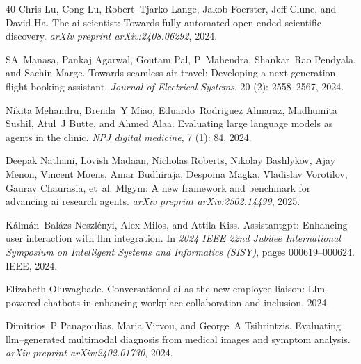 \begin{thebibliography}{40}
Chris Lu, Cong Lu, Robert~Tjarko Lange, Jakob Foerster, Jeff Clune, and David Ha.
\newblock The ai scientist: Towards fully automated open-ended scientific discovery.
\newblock \emph{arXiv preprint arXiv:2408.06292}, 2024.

SA~Manasa, Pankaj Agarwal, Goutam Pal, P~Mahendra, Shankar~Rao Pendyala, and Sachin Marge.
\newblock Towards seamless air travel: Developing a next-generation flight booking assistant.
\newblock \emph{Journal of Electrical Systems}, 20 (2): 2558--2567, 2024.

Nikita Mehandru, Brenda~Y Miao, Eduardo~Rodriguez Almaraz, Madhumita Sushil, Atul~J Butte, and Ahmed Alaa.
\newblock Evaluating large language models as agents in the clinic.
\newblock \emph{NPJ digital medicine}, 7 (1): 84, 2024.

Deepak Nathani, Lovish Madaan, Nicholas Roberts, Nikolay Bashlykov, Ajay Menon, Vincent Moens, Amar Budhiraja, Despoina Magka, Vladislav Vorotilov, Gaurav Chaurasia, et~al.
\newblock Mlgym: A new framework and benchmark for advancing ai research agents.
\newblock \emph{arXiv preprint arXiv:2502.14499}, 2025.

K{\'a}lm{\'a}n~Bal{\'a}zs Neszl{\'e}nyi, Alex Milos, and Attila Kiss.
\newblock Assistantgpt: Enhancing user interaction with llm integration.
\newblock In \emph{2024 IEEE 22nd Jubilee International Symposium on Intelligent Systems and Informatics (SISY)}, pages 000619--000624. IEEE, 2024.

Elizabeth Oluwagbade.
\newblock Conversational ai as the new employee liaison: Llm-powered chatbots in enhancing workplace collaboration and inclusion, 2024.

Dimitrios~P Panagoulias, Maria Virvou, and George~A Tsihrintzis.
\newblock Evaluating llm--generated multimodal diagnosis from medical images and symptom analysis.
\newblock \emph{arXiv preprint arXiv:2402.01730}, 2024.


\end{thebibliography}
